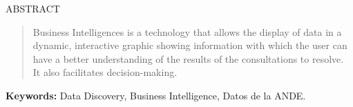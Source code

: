 \begin{center}
	ABSTRACT
\end{center}

\vspace*{2\baselineskip}
\begin{abstract}
	Business Intelligences is a technology that allows the display of data in a dynamic, interactive graphic showing information with which the user can have a better understanding of the results of the consultations to resolve. It also facilitates decision-making.
\end{abstract}

\vspace*{1\baselineskip}
\textbf{Keywords:} Data Discovery, Business Intelligence, Datos de la ANDE.